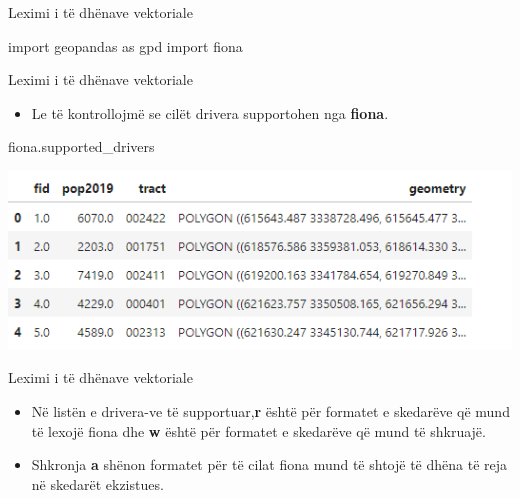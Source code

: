 \documentclass[
  ignorenonframetext,
]{beamer}
\newenvironment{Shaded}{\begin{snugshade}}{\end{snugshade}}
\newcommand{\ImportTok}[1]{#1}
\newcommand{\NormalTok}[1]{#1}
\providecommand{\tightlist}{%
  \setlength{\itemsep}{0pt}\setlength{\parskip}{0pt}}
\begin{document}
\begin{frame}[fragile]{Leximi i të dhënave vektoriale}
\protect\hypertarget{leximi-i-tuxeb-dhuxebnave-vektoriale-1}{}

\begin{Shaded}
\begin{Highlighting}[]
\ImportTok{import}\NormalTok{ geopandas }\ImportTok{as}\NormalTok{ gpd}
\ImportTok{import}\NormalTok{ fiona}
\end{Highlighting}
\end{Shaded}
\end{frame}

\begin{frame}[fragile]{Leximi i të dhënave vektoriale}
\protect\hypertarget{leximi-i-tuxeb-dhuxebnave-vektoriale-2}{}
\begin{itemize}
\tightlist
\item
  Le të kontrollojmë se cilët drivera supportohen nga \textbf{fiona}.
\end{itemize}


\begin{Shaded}
\begin{Highlighting}[]
\NormalTok{fiona.supported\_drivers}
\end{Highlighting}
\end{Shaded}

\includegraphics{./Figs/fiona1.png}
\end{frame}

\begin{frame}{Leximi i të dhënave vektoriale}
\protect\hypertarget{leximi-i-tuxeb-dhuxebnave-vektoriale-3}{}
\begin{itemize}
\item
  Në listën e drivera-ve të supportuar,\textbf{r} është për formatet e
  skedarëve që mund të lexojë fiona dhe \textbf{w} është për formatet e
  skedarëve që mund të shkruajë.
\item
  Shkronja \textbf{a} shënon formatet për të cilat fiona mund të shtojë
  të dhëna të reja në skedarët ekzistues.
\end{itemize}
\end{frame}
\end{document}

